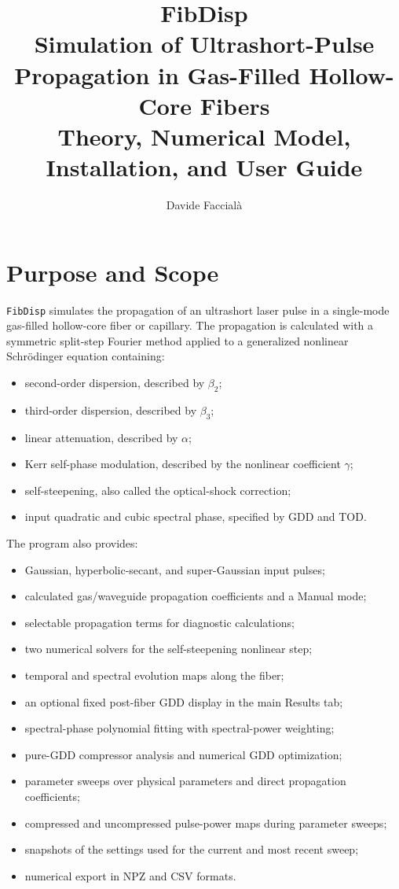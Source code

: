 \documentclass[11pt,a4paper]{article}
\title{\textbf{FibDisp}\\
\large Simulation of Ultrashort-Pulse Propagation in Gas-Filled Hollow-Core Fibers\\
\large Theory, Numerical Model, Installation, and User Guide}
\author{Davide Faccial\`a}
\date{}
\begin{document}
\maketitle
\tableofcontents
\newpage

\section{Purpose and Scope}

\texttt{FibDisp} simulates the propagation of an ultrashort laser pulse in a
single-mode gas-filled hollow-core fiber or capillary. The propagation is
calculated with a symmetric split-step Fourier method applied to a generalized
nonlinear Schr\"odinger equation containing:

\begin{itemize}
    \item second-order dispersion, described by $\beta_2$;
    \item third-order dispersion, described by $\beta_3$;
    \item linear attenuation, described by $\alpha$;
    \item Kerr self-phase modulation, described by the nonlinear coefficient
    $\gamma$;
    \item self-steepening, also called the optical-shock correction;
    \item input quadratic and cubic spectral phase, specified by GDD and TOD.
\end{itemize}

The program also provides:

\begin{itemize}
    \item Gaussian, hyperbolic-secant, and super-Gaussian input pulses;
    \item calculated gas/waveguide propagation coefficients and a Manual mode;
    \item selectable propagation terms for diagnostic calculations;
    \item two numerical solvers for the self-steepening nonlinear step;
    \item temporal and spectral evolution maps along the fiber;
    \item an optional fixed post-fiber GDD display in the main Results tab;
    \item spectral-phase polynomial fitting with spectral-power weighting;
    \item pure-GDD compressor analysis and numerical GDD optimization;
    \item parameter sweeps over physical parameters and direct propagation
    coefficients;
    \item compressed and uncompressed pulse-power maps during parameter sweeps;
    \item snapshots of the settings used for the current and most recent sweep;
    \item numerical export in NPZ and CSV formats.
\end{itemize}
\end{document}
